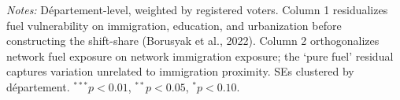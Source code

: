 \begin{table}[htbp]
   \par \raggedright 
   \textit{Notes:} D\'{e}partement-level, weighted by registered voters. Column 1 residualizes fuel vulnerability on immigration, education, and urbanization before constructing the shift-share (Borusyak et al., 2022). Column 2 orthogonalizes network fuel exposure on network immigration exposure; the `pure fuel' residual captures variation unrelated to immigration proximity. SEs clustered by d\'{e}partement. $^{***}p<0.01$, $^{**}p<0.05$, $^{*}p<0.10$.
\end{table}
